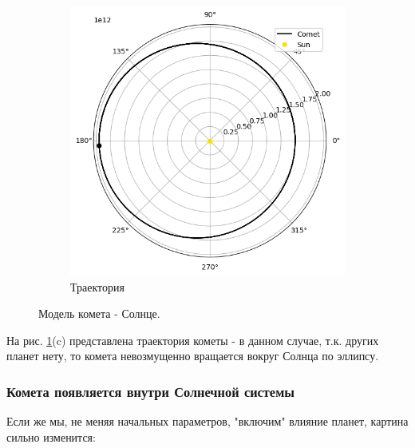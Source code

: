 \begin{figure}[H]
\begin{subfigure}{0.49\linewidth}
		\includegraphics[width=1\linewidth]{imgs_8/trjSunComet.png}
		\caption{Траектория}
    \end{subfigure}
    \caption{Модель комета - Солнце.}
    \label{fig:SunComet}
\end{figure}
На рис. \ref{fig:SunComet}(c) представлена траектория кометы - в данном случае, т.к. других планет нету, то комета
невозмущенно вращается вокруг Солнца по эллипсу.
\subsubsection*{Комета появляется внутри Солнечной системы}
Если же мы, не меняя начальных параметров, "включим" влияние планет, картина сильно изменится:

